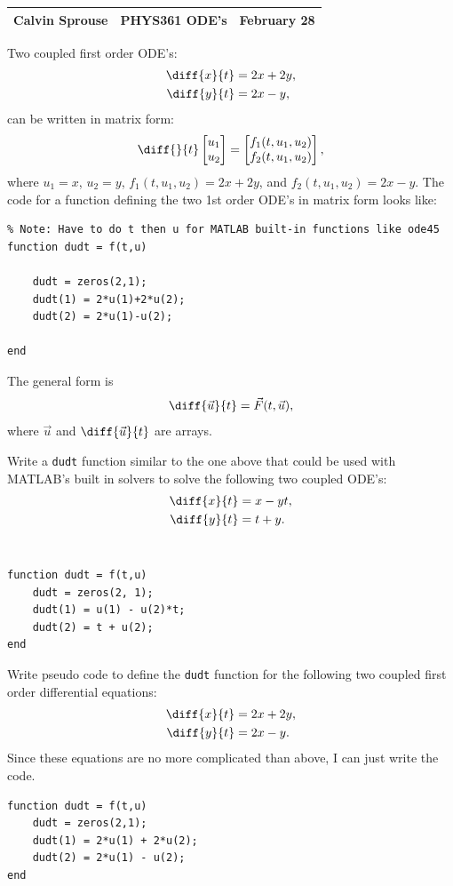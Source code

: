 \documentclass[a4paper, 12pt]{config/homework}
\begin{document}
\noindent
\begin{tabularx}{\textwidth}{>{\centering\arraybackslash}X>{\centering\arraybackslash}X>{\centering\arraybackslash}X}
Calvin Sprouse & PHYS361 ODE's & 2024 February 28\\
\midrule
\end{tabularx}

\vspace{\baselineskip}\noindent
Two coupled first order ODE's:
\begin{align*}
\diff{x}{t} &= 2x + 2y, \\
\diff{y}{t} &= 2x - y,
\end{align*}
can be written in matrix form:
\[ \diff{}{t}\matr{u_1 \\ u_2} = \matr{f_1(t,u_1,u_2)\\ f_2(t,u_1,u_2)},\]
where \(u_1=x\), \(u_2=y\), \(f_1(t,u_1,u_2)=2x+2y\), and \(f_2(t,u_1,u_2)=2x-y\). The code for a function defining the two 1st order ODE's in matrix form looks like:
\begin{verbatim}
% Note: Have to do t then u for MATLAB built-in functions like ode45
function dudt = f(t,u)

    dudt = zeros(2,1);
    dudt(1) = 2*u(1)+2*u(2);
    dudt(2) = 2*u(1)-u(2);

end
\end{verbatim}
The general form is
\[\diff{\vec{u}}{t} = \vec{F}(t,\vec{u}),\]
where \(\vec{u}\) and \(\diff{\vec{u}}{t}\) are arrays.

\pagebreak\noindent
Write a \texttt{dudt} function similar to the one above that could be used with MATLAB's built in solvers to solve the following two coupled ODE's:
\begin{align*}
\diff{x}{t} &= x -yt,
\\ \diff{y}{t} &= t + y.
\end{align*}
\\
\begin{verbatim}
function dudt = f(t,u)
    dudt = zeros(2, 1);
    dudt(1) = u(1) - u(2)*t;
    dudt(2) = t + u(2);
end
\end{verbatim}

\vspace{\baselineskip}\noindent
Write pseudo code to define the \texttt{dudt} function for the following two coupled first order differential equations:
\begin{align*}
\diff{x}{t} &= 2x + 2y, \\
\diff{y}{t} &= 2x - y.
\end{align*}
Since these equations are no more complicated than above, I can just write the code.
\begin{verbatim}
function dudt = f(t,u)
    dudt = zeros(2,1);
    dudt(1) = 2*u(1) + 2*u(2);
    dudt(2) = 2*u(1) - u(2);
end
\end{verbatim}
\end{document}
